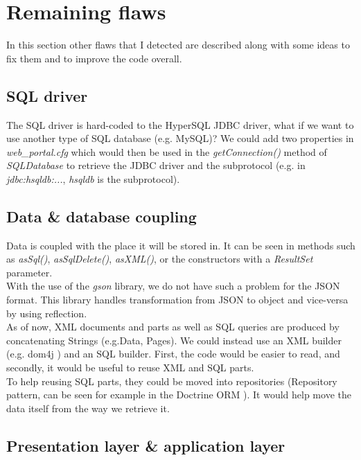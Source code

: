 \section{Remaining flaws}

In this section other flaws that I detected are described along with some ideas
to fix them and to improve the code overall.

\subsection*{SQL driver}
The SQL driver is hard-coded to the HyperSQL JDBC driver, what if we want to use
another type of SQL database (e.g. MySQL)? We could add two properties in
\emph{web\_portal.cfg} which would then be used in the \emph{getConnection()}
method of \emph{SQLDatabase} to retrieve the JDBC driver and the subprotocol
(e.g. in \emph{jdbc:hsqldb:...}, \emph{hsqldb} is the subprotocol).

\subsection*{Data \& database coupling}
Data is coupled with the place it will be stored in. It can be seen in methods
such as \emph{asSql()}, \emph{asSqlDelete()}, \emph{asXML()}, or the
constructors with a \emph{ResultSet} parameter.\\

With the use of the \emph{gson} library, we do not have such a problem for the
JSON format. This library handles transformation from JSON to object and
vice-versa by using reflection.\\

As of now, XML documents and parts as well as SQL queries are produced by
concatenating Strings (e.g.Data, Pages). We could instead use an XML builder
(e.g. dom4j \cite{cite:dom4j}) and an SQL builder. First, the code would be
easier to read, and secondly, it would be useful to reuse XML and SQL parts.\\

To help reusing SQL parts, they could be moved into repositories (Repository
pattern, can be seen for example in the Doctrine ORM \cite{cite:doctrine}).
It would help move the data itself from the way we retrieve it.

\subsection*{Presentation layer \& application layer}

